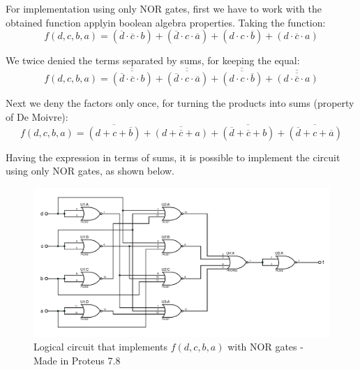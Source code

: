 For implementation using only NOR gates, first we have to work
 with the obtained function applyin boolean algebra properties. 
 Taking the function:
\[
    f(d,c,b,a)=(\overline{d} \cdot \overline{c} \cdot b)+
    (\overline{d} \cdot c \cdot \overline{a})+
    (d \cdot c \cdot \overline{b})+
    (d \cdot \overline{c} \cdot a)
\]
\par
We twice denied the terms separated by sums, for keeping the equal:
\[
    f(d,c,b,a)=\overline{\overline{(\overline{d} \cdot \overline{c} \cdot b)}}+
    \overline{\overline{(\overline{d} \cdot c \cdot \overline{a})}}+
    \overline{\overline{(d \cdot c \cdot \overline{b})}}+
    \overline{\overline{(d \cdot \overline{c} \cdot a)  }}
\]
\par
Next we deny the factors only once, for turning the products 
into sums (property of De Moivre):
\[
    \boxed{f(d,c,b,a)=\overline{(d+c+\overline{b})}+
    \overline{(d+\overline{c}+a)}+
    \overline{(\overline{d}+\overline{c}+b)}+
    \overline{(\overline{d}+c+\overline{a})}}
\]
\par

Having the expression in terms of sums, it is possible to implement 
the circuit using only NOR gates, as shown below.

\begin{figure}[H]
    \begin{centering}
    \includegraphics[width=1\textwidth]{data/ImplementacionEj2_NOR}
    \par\end{centering}
    \caption{Logical circuit that implements $f(d,c,b,a)$
    with NOR gates - Made in Proteus 7.8}
\end{figure}


